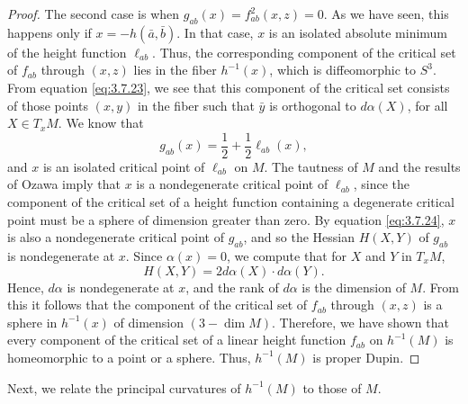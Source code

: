 \documentclass[12pt]{article}
\begin{document}
\begin{proof}
The second case is when $g_{ab}(x) = f_{ab}^2 (x,z) = 0$.  As we have seen, this happens only if 
$x = - h(\bar{a}, \bar{b})$.  In that case, $x$ is an isolated absolute minimum of the height function $\ell_{ab}$.
Thus, the corresponding component of the critical set of $f_{ab}$ through $(x,z)$ lies in the fiber $h^{-1}(x)$, 
which is diffeomorphic to $S^3$.  From equation \eqref{eq:3.7.23}, we see that this component of the critical set
consists of those points $(x,y)$ in the fiber such that $\bar{y}$ is orthogonal to $d \alpha (X)$, for all
$X \in T_xM$.  We know that 
\begin{equation} 
\label{eq:3.7.24}
g_{ab}(x) = \frac{1}{2} + \frac{1}{2} \ell_{ab} (x),
\end{equation}
and $x$ is an isolated critical point of $\ell_{ab}$ on $M$.  The tautness of $M$ and the results of Ozawa \cite{Oz}
imply that $x$ is a nondegenerate critical point of $\ell_{ab}$, since the component of the critical set
of a height function
containing a degenerate critical point must be a sphere of dimension greater than zero.
By equation \eqref{eq:3.7.24}, $x$ is also a nondegenerate critical point of $g_{ab}$, and so the Hessian $H(X,Y)$
of $g_{ab}$ is nondegenerate at $x$.  Since $\alpha (x) = 0$, we compute that for $X$ and $Y$ in $T_xM$,
\begin{displaymath}
H(X,Y) = 2 d \alpha (X) \cdot d \alpha (Y).
\end{displaymath}
Hence, $d \alpha$ is nondegenerate at $x$, and the 
rank of $d \alpha$ is the dimension of $M$.  From this it follows
that the component of the critical set of $f_{ab}$ through $(x,z)$ is a sphere in $h^{-1}(x)$ of dimension
$(3 - \dim M)$.  Therefore, we have shown that every component of the critical set of a linear height
function $f_{ab}$ on $h^{-1}(M)$ is homeomorphic to a point or a sphere.  Thus, $h^{-1}(M)$ is proper Dupin.
\end{proof}

Next, we relate the principal curvatures of $h^{-1}(M)$ to those of $M$.
\end{document}
